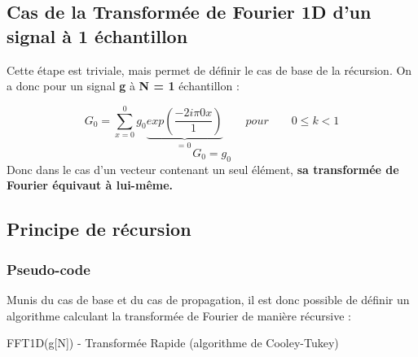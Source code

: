 \documentclass{article}
\begin{document}
\subsection{Cas de la Transformée de Fourier 1D d'un signal à 1 échantillon}
Cette étape est triviale, mais permet de définir le cas de base de la récursion. On a donc pour un signal \textbf{g} à \textbf{N = 1} échantillon :

\begin{equation}
	G_{0} = \sum_{x = 0}^{0}g_{0} \underbrace{exp(\frac{-2i\pi 0x}{1})}_\text{= 0} \qquad pour \qquad 0 \leq k < 1
\end{equation}
\begin{equation}
	G_{0} = g_{0}
\end{equation}
Donc dans le cas d'un vecteur contenant un seul élément, \textbf{sa transformée de Fourier équivaut à lui-même.}

\newpage

\subsection{Principe de récursion}

\subsubsection{Pseudo-code}

Munis du cas de base et du cas de propagation, il est donc possible de définir un algorithme calculant la transformée de Fourier de manière récursive :

\begin{algorithm}
	\caption{FFT1D(g[N]) - Transformée Rapide (algorithme de Cooley-Tukey)}\label{alg:ct}
\end{algorithm}
\end{document}
